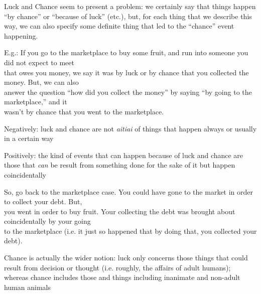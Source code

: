 \documentclass[oneside]{article}
\begin{document}
\noindent Luck and Chance seem to present a problem: we certainly say that things happen ``by chance'' or ``because of luck'' (etc.), but, for each thing that we describe this way, we can also specify some definite thing that led to the ``chance'' event happening.
\vspace*{2mm}

E.g.: If you go to the marketplace to buy some fruit, and run into someone you did not expect to meet\\\hspace*{6mm}that owes you money, we say it was by luck or by chance that you collected the money. But, we can also\\\hspace*{6mm}answer the question ``how did you collect the money'' by saying ``by going to the marketplace,'' and it\\\hspace*{6mm}wasn't by chance that you went to the marketplace.
\vspace{2mm}

\noindent Negatively: luck and chance are not \emph{aitiai} of things that happen always or usually in a certain way
\vspace*{2mm}

\noindent Positively: the kind of events that can happen because of luck and chance are those that \emph{can}  be result from something done for the sake of it but happen coincidentally
\vspace*{2mm}

So, go back to the marketplace case. You could have gone to the market in order to collect your debt. But,\\\hspace*{6mm}you went in order to buy fruit. Your collecting the debt was brought about coincidentally by your going\\\hspace*{6mm}to the marketplace (i.e. it just so happened that by doing that, you collected your debt).
\vspace*{2mm}

\noindent Chance is actually the wider notion: luck only concerns those things that could result from decision or thought (i.e. roughly, the affairs of adult humans); whereas chance includes those and things including inanimate and non-adult human animals
\end{document}
